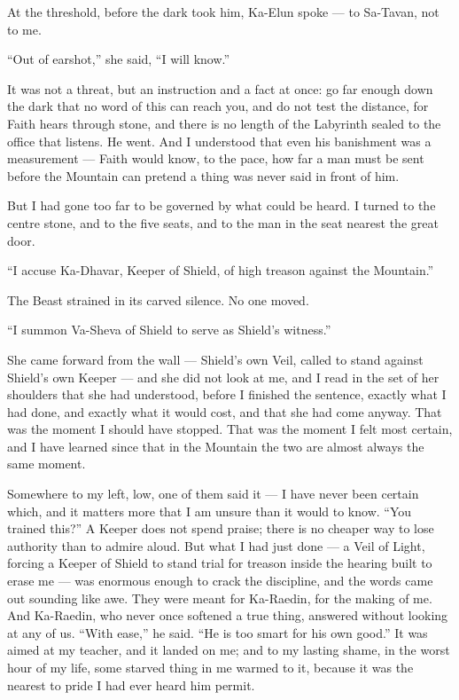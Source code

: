 At the threshold, before the dark took him, Ka-Elun spoke — to Sa-Tavan, not to me.\par
 
``Out of earshot,'' she said, ``I will know.''\par
 
It was not a threat, but an instruction and a fact at once: go far enough down the dark that no word of this can reach you, and do not test the distance, for Faith hears through stone, and there is no length of the Labyrinth sealed to the office that listens. He went. And I understood that even his banishment was a measurement — Faith would know, to the pace, how far a man must be sent before the Mountain can pretend a thing was never said in front of him.\par
 
But I had gone too far to be governed by what could be heard. I turned to the centre stone, and to the five seats, and to the man in the seat nearest the great door.\par
 
``I accuse Ka-Dhavar, Keeper of Shield, of high treason against the Mountain.''\par
 
The Beast strained in its carved silence. No one moved.\par
 
``I summon Va-Sheva of Shield to serve as Shield's witness.''\par
 
She came forward from the wall — Shield's own Veil, called to stand against Shield's own Keeper — and she did not look at me, and I read in the set of her shoulders that she had understood, before I finished the sentence, exactly what I had done, and exactly what it would cost, and that she had come anyway. That was the moment I should have stopped. That was the moment I felt most certain, and I have learned since that in the Mountain the two are almost always the same moment.\par
 
Somewhere to my left, low, one of them said it — I have never been certain which, and it matters more that I am unsure than it would to know. ``You trained this?'' A Keeper does not spend praise; there is no cheaper way to lose authority than to admire aloud. But what I had just done — a Veil of Light, forcing a Keeper of Shield to stand trial for treason inside the hearing built to erase me — was enormous enough to crack the discipline, and the words came out sounding like awe. They were meant for Ka-Raedin, for the making of me. And Ka-Raedin, who never once softened a true thing, answered without looking at any of us. ``With ease,'' he said. ``He is too smart for his own good.'' It was aimed at my teacher, and it landed on me; and to my lasting shame, in the worst hour of my life, some starved thing in me warmed to it, because it was the nearest to pride I had ever heard him permit.\par

